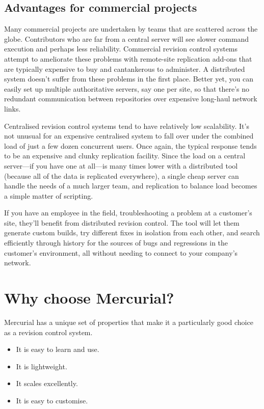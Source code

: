 \subsection{Advantages for commercial projects}

Many commercial projects are undertaken by teams that are scattered
across the globe.  Contributors who are far from a central server will
see slower command execution and perhaps less reliability.  Commercial
revision control systems attempt to ameliorate these problems with
remote-site replication add-ons that are typically expensive to buy
and cantankerous to administer.  A distributed system doesn't suffer
from these problems in the first place.  Better yet, you can easily
set up multiple authoritative servers, say one per site, so that
there's no redundant communication between repositories over expensive
long-haul network links.

Centralised revision control systems tend to have relatively low
scalability.  It's not unusual for an expensive centralised system to
fall over under the combined load of just a few dozen concurrent
users.  Once again, the typical response tends to be an expensive and
clunky replication facility.  Since the load on a central server---if
you have one at all---is many times lower with a distributed
tool (because all of the data is replicated everywhere), a single
cheap server can handle the needs of a much larger team, and
replication to balance load becomes a simple matter of scripting.

If you have an employee in the field, troubleshooting a problem at a
customer's site, they'll benefit from distributed revision control.
The tool will let them generate custom builds, try different fixes in
isolation from each other, and search efficiently through history for
the sources of bugs and regressions in the customer's environment, all
without needing to connect to your company's network.

\section{Why choose Mercurial?}

Mercurial has a unique set of properties that make it a particularly
good choice as a revision control system.
\begin{itemize}
\item It is easy to learn and use.
\item It is lightweight.
\item It scales excellently.
\item It is easy to customise.
\end{itemize}


